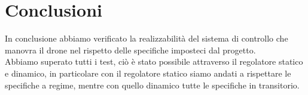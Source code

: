 \documentclass[a4paper, 11pt]{article}
\begin{document}
\section{Conclusioni}
In conclusione abbiamo verificato la realizzabilità del sistema di controllo che manovra il drone nel rispetto delle specifiche imposteci dal progetto.\\ Abbiamo superato tutti i test, ciò è stato possibile attraverso il regolatore statico e dinamico, in particolare con il regolatore statico siamo andati a rispettare le specifiche a regime, mentre con quello dinamico tutte le specifiche in transitorio.
\end{document}
